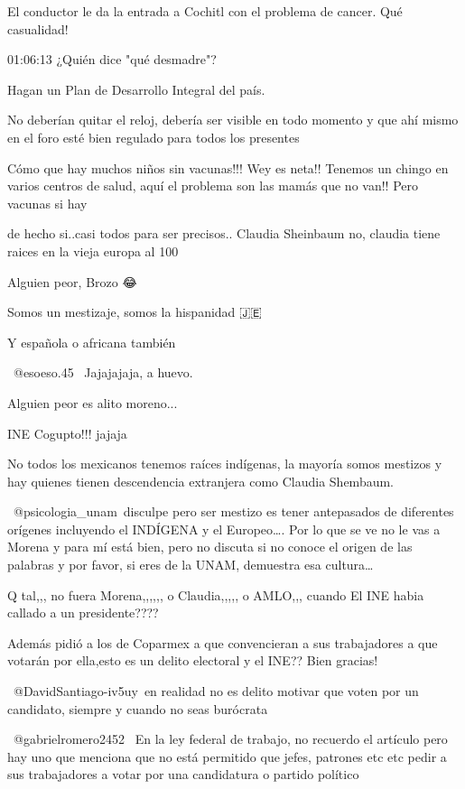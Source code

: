 El conductor le da la entrada a Cochitl con el problema de cancer. Qué casualidad!

01:06:13 ¿Quién dice "qué desmadre"?

Hagan un Plan de Desarrollo Integral del país.

No deberían quitar el reloj, debería ser visible en todo momento y que ahí mismo en el foro esté bien regulado para todos los presentes

Cómo que hay muchos niños sin vacunas!!! Wey es neta!! Tenemos un chingo en varios centros de salud, aquí el problema son las mamás que no van!! Pero vacunas si hay

de hecho si..casi todos para ser precisos.. Claudia Sheinbaum no, claudia tiene raices en la vieja europa  al 100%

Alguien peor, Brozo 😂

Somos un mestizaje, somos la hispanidad 🇯🇪

Y española o africana también

 @esoeso.45  Jajajajaja, a huevo.

Alguien peor es alito moreno...

INE Cogupto!!! jajaja

No todos los mexicanos tenemos raíces indígenas, la mayoría somos mestizos y hay quienes tienen descendencia extranjera como Claudia Shembaum.

⁠ @psicologia_unam disculpe pero ser mestizo es tener antepasados de diferentes orígenes incluyendo el INDÍGENA y el Europeo…. Por lo que se ve no le vas a Morena y para mí está bien, pero no discuta si no conoce el origen de las palabras y por favor, si eres de la UNAM, demuestra esa cultura…

Q tal,,, no fuera Morena,,,,,, o Claudia,,,,, o AMLO,,, cuando El INE habia callado a un presidente????

Además pidió a los de Coparmex a que convencieran a sus trabajadores a que votarán por ella,esto es un delito electoral y el INE?? Bien gracias!

​ @DavidSantiago-iv5uy en realidad no es delito motivar que voten por un candidato, siempre y cuando no seas burócrata

 @gabrielromero2452  En la ley federal de trabajo, no recuerdo el artículo pero hay uno que menciona que no está permitido que jefes, patrones etc etc pedir a sus trabajadores a votar por una candidatura o partido político

